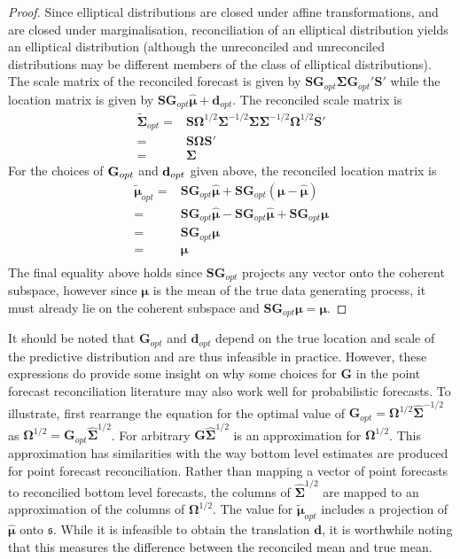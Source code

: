 \documentclass[a4paper, 11pt]{article}
\theoremstyle{theo}
\theoremstyle{definition}
\begin{document}
\begin{proof}
   Since elliptical distributions are closed under affine transformations, and are closed under marginalisation, reconciliation of an elliptical distribution yields an elliptical distribution (although the unreconciled and unreconciled distributions may be different members of the class of elliptical distributions).  The scale matrix of the reconciled forecast is given by $\bm{S}\bm{G}_{opt}{\bm \Sigma}{\bm G}_{opt}'{\bm S}'$ while the location matrix is given by $\bm{S}\bm{G}_{opt}\hat{\bm \mu}+{\bm d}_{opt}$.  The reconciled scale matrix is 
   \begin{align*}
   \tilde{\bm \Sigma}_{opt}=&{\bm S}{\bm\Omega}^{1/2}{\bm\Sigma}^{-1/2}{\bm \Sigma}{\bm\Sigma}^{-1/2}{\bm\Omega}^{1/2}{\bm S}'\\
   =&{\bm S}{\bm \Omega}{\bm S}'\\
   =&{\bm \Sigma}
   \end{align*}
   For the choices of ${\bf G}_{opt}$ and ${\bf d}_{opt}$ given above, the reconciled location matrix is 
   \begin{align*}
   \tilde{\bm \mu}_{opt}=&{\bm S}{\bm G}_{opt}\hat{\bm \mu}+{\bm S}{\bm G}_{opt}\left({\bm \mu}-\hat{\bm \mu}\right)\\
   =&{\bm S}{\bm G}_{opt}\hat{\bm \mu}-{\bm S}{\bm G}_{opt}\hat{\bm \mu}+{\bm S}{\bm G}_{opt}{\bm \mu}\\
   =&{\bm S}{\bm G}_{opt}{\bm \mu}\\
   =&{\bm \mu}\\
   \end{align*}
   The final equality above holds since ${\bm S}{\bm G}_{opt}$ projects any vector onto the coherent subspace, however since ${\bm \mu}$ is the mean of the true data generating process, it must already lie on the coherent subspace and ${\bm S}{\bm G}_{opt}{\bm \mu}={\bm \mu}$.
\end{proof}	
It should be noted that ${\bm G}_{opt}$ and ${\bm d}_{opt}$ depend on the true location and scale of the predictive distribution and are thus infeasible in practice.  However, these expressions do provide some insight on why some choices for ${\bm G}$ in the point forecast reconciliation literature may also work well for probabilistic forecasts.  To illustrate, first rearrange the equation for the optimal value of  $\bm{G}_{opt}={\bm\Omega}^{1/2}\hat{\bm\Sigma}^{-1/2}$ as ${\bm\Omega}^{1/2}=\bm{G}_{opt}\hat{\bm\Sigma}^{1/2}$. For arbitrary ${\bm G}\hat{\bm\Sigma}^{1/2}$ is an approximation for ${\bm\Omega}^{1/2}$.  This approximation has similarities with the way bottom level estimates are produced for point forecast reconciliation.  Rather than mapping a vector of point forecasts to reconcilied bottom level forecasts, the columns of  $\hat{\bm\Sigma}^{1/2}$ are mapped to an approximation of the columns of ${\bm\Omega}^{1/2}$.  The value for $\tilde{\bm \mu}_{opt}$ includes a projection of $\hat{\bm \mu}$ onto $\mathfrak{s}$. While it is infeasible to obtain the translation ${\bm d}$, it is worthwhile noting that this measures the difference between the reconciled mean and true mean. 
\end{document}

